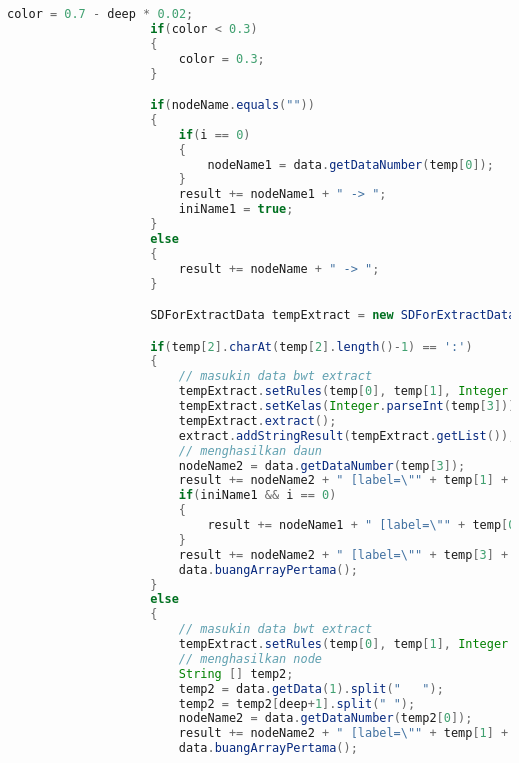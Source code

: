 \begin{lstlisting}[language=Java,basicstyle=\tiny,caption=DotConverter.java]
                    color = 0.7 - deep * 0.02;
                    if(color < 0.3)
                    {
                        color = 0.3;
                    }

                    if(nodeName.equals(""))
                    {
                        if(i == 0)
                        {
                            nodeName1 = data.getDataNumber(temp[0]);
                        }
                        result += nodeName1 + " -> ";
                        iniName1 = true;
                    }
                    else
                    {
                        result += nodeName + " -> ";
                    }

                    SDForExtractData tempExtract = new SDForExtractData(extract);

                    if(temp[2].charAt(temp[2].length()-1) == ':')
                    {   
                        // masukin data bwt extract
                        tempExtract.setRules(temp[0], temp[1], Integer.parseInt(temp[2].substring(0, temp[2].length()-1)));
                        tempExtract.setKelas(Integer.parseInt(temp[3]));
                        tempExtract.extract();
                        extract.addStringResult(tempExtract.getList());
                        // menghasilkan daun
                        nodeName2 = data.getDataNumber(temp[3]);
                        result += nodeName2 + " [label=\"" + temp[1] + " " + temp[2].substring(0, temp[2].length()-1) +  "\"]\n";
                        if(iniName1 && i == 0)
                        {
                            result += nodeName1 + " [label=\"" + temp[0] + "\",shape=box,style=filled,color=\"1.0 " + color + " 1.0\"]\n";
                        }
                        result += nodeName2 + " [label=\"" + temp[3] + "\"]\n";
                        data.buangArrayPertama();
                    }
                    else 
                    {
                        // masukin data bwt extract
                        tempExtract.setRules(temp[0], temp[1], Integer.parseInt(temp[2]));
                        // menghasilkan node
                        String [] temp2;
                        temp2 = data.getData(1).split("   ");
                        temp2 = temp2[deep+1].split(" ");
                        nodeName2 = data.getDataNumber(temp2[0]);
                        result += nodeName2 + " [label=\"" + temp[1] + " " + temp[2] +  "\",shape=box,style=filled,color=\"1.0 " + color + " 1.0\"]\n";
                        data.buangArrayPertama();


\end{lstlisting}
